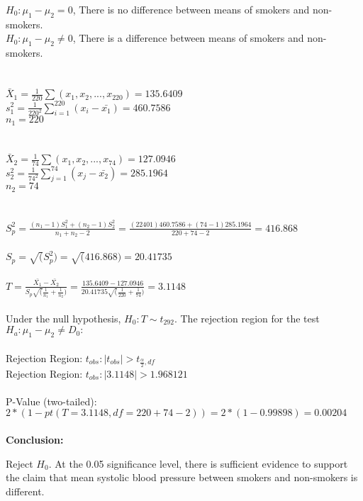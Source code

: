 \documentclass[
]{article}
\begin{document}
\hfill\break
\hfill\break
\(H_{0}: \mu_{1}-\mu_{2} = 0\), There is no difference between means of
smokers and non-smokers.\\
\(H_{0}: \mu_{1}-\mu_{2} ≠ 0\), There is a difference between means of
smokers and non-smokers.\\
~\\
~\\
\(\bar{X}_{1} = \frac{1}{220}\sum(x_{1},x_{2},...,x_{220}) = 135.6409\)\\
\(s^2_{1} = \frac{1}{220^2}\sum^{220}_{i=1}(x_{i}-\bar{x_{1}}) = 460.7586\)\\
\(n_{1} = 220\)\\
~\\
~\\
\(\bar{X}_{2} = \frac{1}{74}\sum(x_{1},x_{2},...,x_{74}) = 127.0946\)\\
\(s^2_{2} = \frac{1}{74^2}\sum^{74}_{j=1}(x_{j}-\bar{x_{2}}) = 285.1964\)\\
\(n_{2} = 74\)\\
~\\
~\\
\(S^2_{p} = \frac{(n_{1}-1)S^2_{1}+(n_{2}-1)S^2_{2}}{n_{1}+n_{2}-2} = \frac{(22401)460.7586+(74-1)285.1964}{220+74-2} = 416.868\)\\
~\\
\(S_{p} = \sqrt(S^2_{p}) = \sqrt(416.868) = 20.41735\)\\
~\\
\(T = \frac{\bar{X_{1}} - \bar{X_{2}}} {S_{p}\sqrt(\frac{1}{n_{1}}+\frac{1}{n_{2}})} = \frac{135.6409 - 127.0946} {20.41735\sqrt(\frac{1}{220}+\frac{1}{74})} =3.1148\)\\
~\\
Under the null hypothesis, \(H_{0}: T \sim t_{292}\). The rejection
region for the test \(H_{a}: \mu_{1}-\mu_{2} ≠ D_{0}:\)\\
~\\
Rejection Region: \({t_{obs} : |t_{obs}| > t_{\frac{\alpha}{2},df}}\)\\
Rejection Region: \({t_{obs} : |3.1148| > 1.968121}\)\\
~\\

P-Value (two-tailed):\\
\(2*(1-pt(T = 3.1148,df = 220+74-2)) = 2*(1-0.99898) = 0.00204\)\\
~\\

\textbf{Conclusion:}

Reject \(H_{0}\). At the 0.05 significance level, there is sufficient
evidence to support the claim that mean systolic blood pressure between
smokers and non-smokers is different.\\
~\\
~\\
\end{document}
